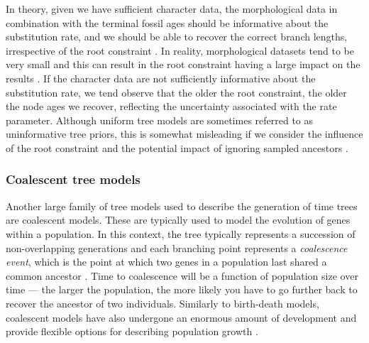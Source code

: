 \documentclass[11pt]{article}
\newcommand{\aw}[1]{{\textcolor{armygreen}{[AW: #1]}}} %
\begin{document}
In theory, given we have sufficient character data, the morphological %
data in combination with the terminal fossil ages should be informative about the substitution rate, and we should be able to recover the correct branch lengths, irrespective of the root constraint \cite{Ronquist2012a,Klopfstein2019}.
In reality, morphological datasets tend to be very small and this can result in the root constraint having a large impact on the results \cite{matzke2016}.
If the character data are not sufficiently informative about the substitution rate, we tend observe that the older the root constraint, the older the node ages we recover, reflecting the uncertainty associated with the rate parameter.
Although uniform tree models are sometimes referred to as uninformative tree priors, this is somewhat misleading if we consider the influence of the root constraint and the potential impact of ignoring sampled ancestors \cite{Gavryushkina2014}.

\subsubsection{Coalescent tree models}
Another large family of tree models used to describe the generation of time trees are coalescent models. These are typically used to model the evolution of genes within a population. 
In this context, the tree typically represents a succession of non-overlapping generations and each branching point represents a \textit{coalescence event}, which is the point at which two genes in a population last shared a common ancestor \cite{Kingman1982}.
Time to coalescence will be a function of population size over time --- the larger the population, the more likely you have to go further back to recover the ancestor of two individuals. %
Similarly to birth-death models, coalescent models have also undergone an enormous amount of development and provide flexible options for describing population growth \cite{Beerli2001, Drummond2005, Mashayekhi2019}. %
\end{document}
